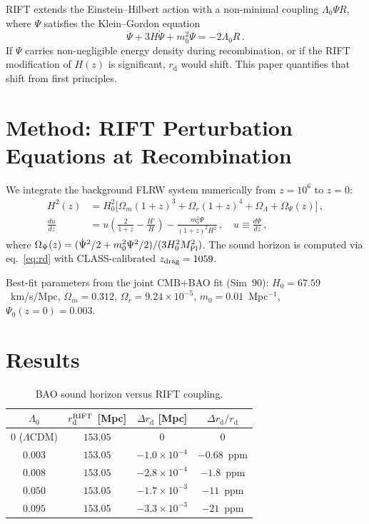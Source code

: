 \documentclass[12pt,a4paper]{article}
\newcommand{\rd}{r_{\mathrm{d}}}
\begin{document}
RIFT extends the Einstein--Hilbert action with a non-minimal coupling
$\Lambda_0\Psi R$, where $\Psi$ satisfies the Klein--Gordon equation
\begin{equation}
\ddot\Psi + 3H\dot\Psi + m_0^2\Psi = -2\Lambda_0 R\,.
\label{eq:KG}
\end{equation}
If $\Psi$ carries non-negligible energy density during recombination,
or if the RIFT modification of $H(z)$ is significant, $\rd$ would shift.
This paper quantifies that shift from first principles.

\section{Method: RIFT Perturbation Equations at Recombination}

We integrate the background FLRW system numerically from $z=10^6$ to $z=0$:
\begin{align}
H^2(z) &= H_0^2\bigl[\Omega_m(1+z)^3 + \Omega_r(1+z)^4
  + \Omega_\Lambda + \Omega_\Psi(z)\bigr]\,,\\
\frac{du}{dz} &= u\!\left(\frac{2}{1+z} - \frac{H'}{H}\right)
  - \frac{m_0^2\Psi}{(1+z)^2 H^2}\,,\quad u \equiv \frac{d\Psi}{dz}\,,
\end{align}
where $\Omega_\Psi(z) = (\dot\Psi^2/2 + m_0^2\Psi^2/2)/(3H_0^2M_{\rm Pl}^2)$.
The sound horizon is computed via eq.~\eqref{eq:rd} with CLASS-calibrated
$z_{\rm drag}=1059$.

Best-fit parameters from the joint CMB+BAO fit (Sim~90):
$H_0=67.59$~km/s/Mpc, $\Omega_m=0.312$, $\Omega_r=9.24\times10^{-5}$,
$m_0=0.01$~Mpc$^{-1}$, $\Psi_0(z=0)=0.003$.

\section{Results}

\begin{table}[h]
\centering
\caption{BAO sound horizon versus RIFT coupling.}
\label{tab:rd}
\begin{tabular}{cccc}
\toprule
$\Lambda_0$ & $\rd^{\rm RIFT}$ [Mpc] & $\Delta\rd$ [Mpc] & $\Delta\rd/\rd$ \\
\midrule
$0$ ($\Lambda$CDM) & $153.05$ & $0$ & $0$ \\
$0.003$ & $153.05$ & $-1.0\times10^{-4}$ & $-0.68$~ppm \\
$0.008$ & $153.05$ & $-2.8\times10^{-4}$ & $-1.8$~ppm \\
$0.050$ & $153.05$ & $-1.7\times10^{-3}$ & $-11$~ppm \\
$0.095$ & $153.05$ & $-3.3\times10^{-3}$ & $-21$~ppm \\
\bottomrule
\end{tabular}
\end{table}
\end{document}
